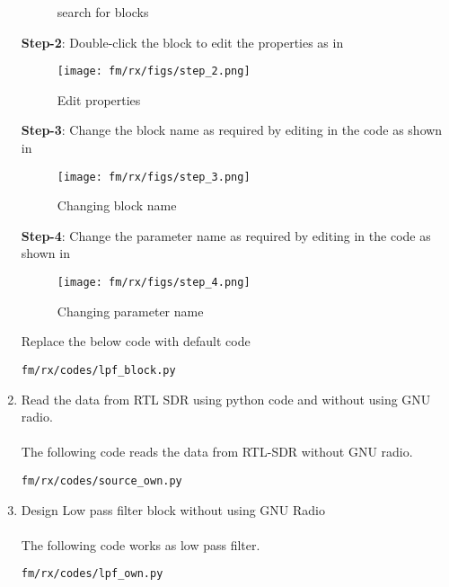 \begin{enumerate}[label=\arabic*.,ref=\thesection.\theenumi]
\begin{figure}[H]
\caption{search for blocks}
\label{fig:search for blocks}
\end{figure}
\textbf{Step-2}:
Double-click the block to edit the properties as in 
\begin{figure}[H]
\centering
\texttt{[image: fm/rx/figs/step\_2.png]}
\caption{Edit properties}
\label{fig:Edit properties}
\end{figure}
\textbf{Step-3}:
Change the block name as required by editing in the code as shown in                                                
\begin{figure}[H]
\centering
\texttt{[image: fm/rx/figs/step\_3.png]}
\caption{Changing block name}
\label{fig:changing block name}
\end{figure}
\textbf{Step-4}:
Change the parameter name as required by editing in the code as shown in                                                
\begin{figure}[H]
\centering
\texttt{[image: fm/rx/figs/step\_4.png]}
\caption{Changing parameter name}
\label{fig:changing parameter name}
\end{figure}
Replace the below code with default code
\begin{lstlisting}
fm/rx/codes/lpf_block.py
\end{lstlisting} 
\item Read the data from RTL SDR using python code and without using GNU radio.
\\
\solution \\
The following code reads the data from RTL-SDR without GNU radio.
\begin{lstlisting}
fm/rx/codes/source_own.py
\end{lstlisting}
\item Design Low pass filter block without using GNU Radio
\\
\solution \\
The following code works as low pass filter.
\begin{lstlisting}
fm/rx/codes/lpf_own.py
\end{lstlisting}
\end{enumerate}